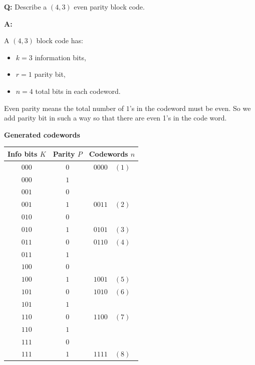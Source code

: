 \documentclass[11pt,a4paper]{book}
\renewcommand{\arraystretch}{1.4}
\newcounter{qna}[chapter]
\renewcommand{\theqna}{\thechapter.\arabic{qna}}
\newenvironment{questionanswerbox}[1][Example]{%
    \refstepcounter{qna}
    \begin{tcolorbox}[
        enhanced,
        breakable,
        colback=softlavender!10,
        colframe=softlavender!200,
        title={#1~\theqna},
        fonttitle=\bfseries,
        coltitle=white,
        colbacktitle=softlavender!200,
        sharp corners,
        boxrule=1pt,
        left=8pt,
        right=8pt,
        top=6pt,
        bottom=6pt
    ]
}{\end{tcolorbox}}
\begin{document}
\begin{questionanswerbox}[(4,3) Even Parity Block Code Example]
\textbf{Q:} Describe a \((4,3)\) even parity block code.

\textbf{A:}

A \((4,3)\) block code has:
\begin{itemize}
    \item \(k=3\) information bits,
    \item \(r=1\) parity bit,
    \item \(n=4\) total bits in each codeword.
\end{itemize}

Even parity means the total number of \(1\)'s in the codeword must be even. So we add parity bit in such a way so that there are even 1's in the code word.
\par\vspace{\baselineskip}
\textbf{Generated codewords}

\begin{center}
\renewcommand{\arraystretch}{1.15}
\setlength{\tabcolsep}{8pt}
\begin{tabular}{|c|c|c|}
\hline
\textbf{Info bits \(K\)} & \textbf{Parity \(P\)} & \textbf{Codewords \(n\)} \\
\hline
\(000\) & \(0\) & \(0000\quad (1)\) \\
\hline
\(000\) & \(1\) & \\
\hline
\(001\) & \(0\) & \\
\hline
\(001\) & \(1\) & \(0011\quad (2)\) \\
\hline
\(010\) & \(0\) & \\
\hline
\(010\) & \(1\) & \(0101\quad (3)\) \\
\hline
\(011\) & \(0\) & \(0110\quad (4)\) \\
\hline
\(011\) & \(1\) & \\
\hline
\(100\) & \(0\) & \\
\hline
\(100\) & \(1\) & \(1001\quad (5)\) \\
\hline
\(101\) & \(0\) & \(1010\quad (6)\) \\
\hline
\(101\) & \(1\) & \\
\hline
\(110\) & \(0\) & \(1100\quad (7)\) \\
\hline
\(110\) & \(1\) & \\
\hline
\(111\) & \(0\) & \\
\hline
\(111\) & \(1\) & \(1111\quad (8)\) \\
\hline
\end{tabular}
\end{center}


\end{questionanswerbox}
\end{document}
